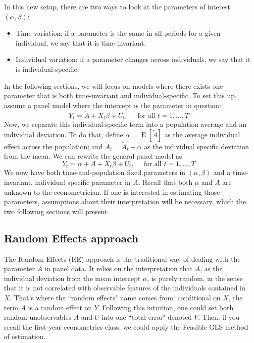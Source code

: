 \documentclass[12pt]{report}
\newcommand{\E}[1]{\operatorname{E}\left[#1\right]}
\begin{document}
In this new setup, there are two ways to look at the parameters of interest $(\alpha, \beta)$:\begin{itemize}
\item Time variation: if a parameter is the same in all periods for a given individual, we say that it is time-invariant. 
\item Individual variation: if a parameter changes across individuals, we say that it is individual-specific.
\end{itemize}

In the following sections, we will focus on models where there exists one parameter that is both time-invariant and individual-specific. To set this up, assume a panel model where the intercept is the parameter in question: $$Y_t = \tilde A + X_t\beta + U_t, \quad \text{ for all } t = 1, ..., T $$
Now, we separate this individual-specific term into a population average and an individual deviation. To do that, define $\alpha = \E{\tilde A}$ as the average individual effect across the population; and $A_i = \tilde A_i - \alpha$ as the individual specific deviation from the mean. We can rewrite the general panel model as: $$Y_t = \alpha + A + X_t\beta + U_t, \quad \text{ for all } t = 1, ..., T $$ We now have both time-and-population fixed parameters in $(\alpha,\beta)$ and a time-invariant, individual specific parameter in $A$. Recall that both $\alpha$ and $A$ are unknown to the econometrician. If one is interested in estimating those parameters, assumptions about their interpretation will be necessary, which the two following sections will present.

\subsection{Random Effects approach}

The Random Effects (RE) approach is the traditional way of dealing with the parameter $A$ in panel data. It relies on the interpretation that $A$, as the individual deviation from the mean intercept $\alpha$, is purely random, in the sense that it is not correlated with observable features of the individuals contained in $X$. That's where the ``random effects" name comes from: conditional on $X$, the term $A$ is a random effect on $Y$. Following this intuition, one could set both random unobservables $A$ and $U$ into one ``total error" denoted $V$. Then, if you recall the first-year econometrics class, we could apply the Feasible GLS method of estimation. 
\end{document}
